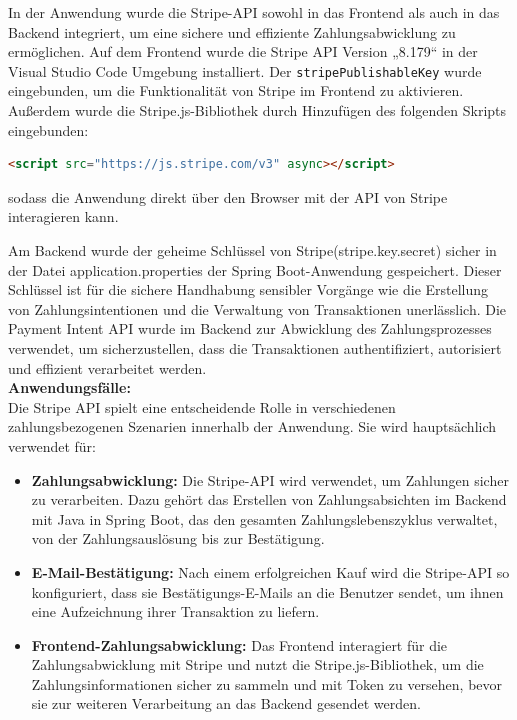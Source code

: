 In der Anwendung wurde die Stripe-API sowohl in das Frontend als auch in das Backend integriert, um eine sichere und effiziente Zahlungsabwicklung zu ermöglichen. Auf dem Frontend wurde die Stripe API Version „8.179“ in der Visual Studio Code Umgebung installiert. Der \texttt{stripePublishableKey} wurde eingebunden, um die Funktionalität von Stripe im Frontend zu aktivieren. Außerdem wurde die Stripe.js-Bibliothek durch Hinzufügen des folgenden Skripts eingebunden:

\begin{lstlisting}[language=HTML, basicstyle=\ttfamily\small, frame=single, backgroundcolor=\color{lightgray}]
	<script src="https://js.stripe.com/v3" async></script>
\end{lstlisting}

sodass die Anwendung direkt über den Browser mit der API von Stripe interagieren kann.

Am Backend wurde der geheime Schlüssel von Stripe(stripe.key.secret) sicher in der Datei application.properties der Spring Boot-Anwendung gespeichert. Dieser Schlüssel ist für die sichere Handhabung sensibler Vorgänge wie die Erstellung von Zahlungsintentionen und die Verwaltung von Transaktionen unerlässlich. Die Payment Intent API wurde im Backend zur Abwicklung des Zahlungsprozesses verwendet, um sicherzustellen, dass die Transaktionen authentifiziert, autorisiert und effizient verarbeitet werden\cite{Stripe-Intents:o.J}. \\


\noindent\textbf{Anwendungsfälle:} \\


Die Stripe API spielt eine entscheidende Rolle in verschiedenen zahlungsbezogenen Szenarien innerhalb der Anwendung. Sie wird hauptsächlich verwendet für:
\begin{itemize}
	\item \textbf{Zahlungsabwicklung:} Die Stripe-API wird verwendet, um Zahlungen sicher zu verarbeiten. Dazu gehört das Erstellen von Zahlungsabsichten im Backend mit Java in Spring Boot, das den gesamten Zahlungslebenszyklus verwaltet, von der Zahlungsauslösung bis zur Bestätigung.
	
	\item \textbf{E-Mail-Bestätigung:} Nach einem erfolgreichen Kauf wird die Stripe-API so konfiguriert, dass sie Bestätigungs-E-Mails an die Benutzer sendet, um ihnen eine Aufzeichnung ihrer Transaktion zu liefern.
	
	\item \textbf{Frontend-Zahlungsabwicklung:} Das Frontend interagiert für die Zahlungsabwicklung mit Stripe und nutzt die Stripe.js-Bibliothek, um die Zahlungsinformationen sicher zu sammeln und mit Token zu versehen, bevor sie zur weiteren Verarbeitung an das Backend gesendet werden.
\end{itemize}


